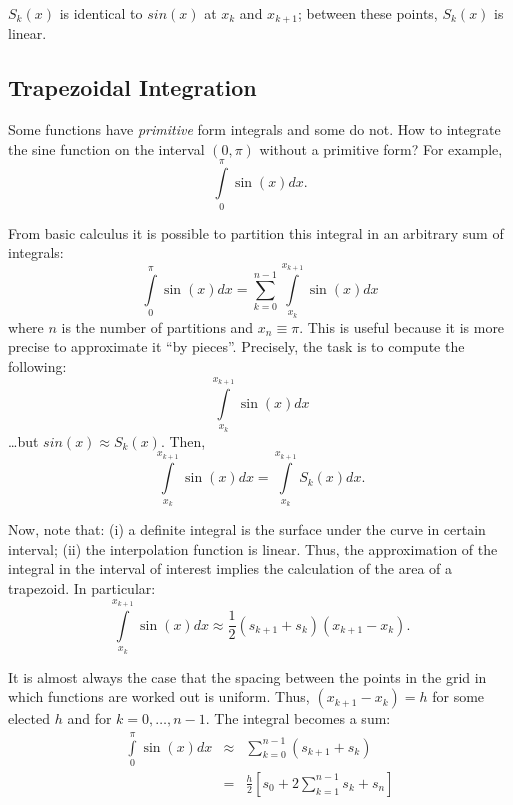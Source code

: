 \noindent $S_{k}(x)$ is identical to $sin(x)$ at $x_{k}$ and $x_{k+1}$; between these points, $S_{k}(x)$ is linear.\\

\subsection{Trapezoidal Integration}
\indent Some functions have \emph{primitive} form integrals and some do not. How to integrate the sine function on the interval $(0,\pi)$ without a primitive form? For example,
\begin{equation}
\int \limits _{0} ^{\pi} \sin(x) dx. \label{eq:trap}
\end{equation} 

\indent From basic calculus it is possible to partition this integral in an arbitrary sum of integrals:
\begin{equation}
\int \limits _{0} ^{\pi} \sin(x)dx = \sum \limits _{k=0} ^{n-1} \int \limits _{x_{k}} ^{x_{k+1}} \sin(x)dx 
\end{equation}
\noindent where $n$ is the number of partitions and $x_{n} \equiv \pi$. This is useful because it is more precise to approximate it ``by pieces''. Precisely, the task is to compute the following:
\begin{equation}
\int \limits _{x_{k}} ^{x_{k+1}} \sin(x)dx 
\end{equation}
\noindent \ldots but $sin(x) \approx S_{k}(x)$. Then,
\begin{equation}
\int \limits _{x_{k}} ^{x_{k+1}} \sin(x)dx = \int \limits _{x_{k}} ^{x_{k+1}} S_{k}(x)dx. 
\end{equation}

\indent Now, note that: (i) a definite integral is the surface under the curve in certain interval; (ii) the interpolation function is linear. Thus, the approximation of the integral in the interval of interest implies the calculation of the area of a trapezoid. In particular:
\begin{equation}
\int \limits _{x_{k}} ^{x_{k+1}} \sin(x)dx \approx \frac{1}{2} (s_{k+1} + s_{k})(x_{k+1} - x_{k}).
\end{equation}

\indent It is almost always the case that the spacing between the points in the grid in which functions are worked out is uniform. Thus, $(x_{k+1} - x_{k}) = h$ for some elected $h$ and for $k = 0, \ldots, n-1$. The integral becomes a sum:
\begin{eqnarray}
\int \limits _{0} ^{\pi} \sin(x)dx &\approx& \sum \limits _{k=0} ^{n-1} (s_{k+1} +s_{k}) \\ \nonumber
&=& \frac{h}{2} \left[ s_{0} + 2 \sum \limits _{k=1} ^{n-1} s_{k} + s_{n}  \right] \label{eq:riem}
\end{eqnarray}


